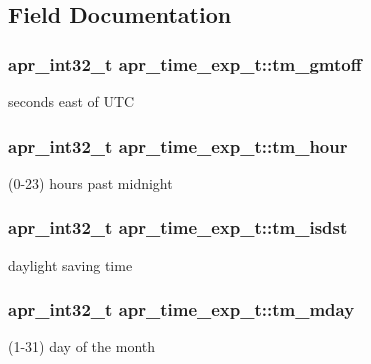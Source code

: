 \subsection{Field Documentation}
\subsubsection[{\texorpdfstring{tm\+\_\+gmtoff}{tm_gmtoff}}]{\setlength{\rightskip}{0pt plus 5cm}apr\+\_\+int32\+\_\+t apr\+\_\+time\+\_\+exp\+\_\+t\+::tm\+\_\+gmtoff}\hypertarget{structapr__time__exp__t_a1102ca16ed70b1c707473431eed58d7b}{}\label{structapr__time__exp__t_a1102ca16ed70b1c707473431eed58d7b}
seconds east of U\+TC 
\subsubsection[{\texorpdfstring{tm\+\_\+hour}{tm_hour}}]{\setlength{\rightskip}{0pt plus 5cm}apr\+\_\+int32\+\_\+t apr\+\_\+time\+\_\+exp\+\_\+t\+::tm\+\_\+hour}\hypertarget{structapr__time__exp__t_a2dbab1d10ed6234c8e9e714e13b7911c}{}\label{structapr__time__exp__t_a2dbab1d10ed6234c8e9e714e13b7911c}
(0-\/23) hours past midnight 
\subsubsection[{\texorpdfstring{tm\+\_\+isdst}{tm_isdst}}]{\setlength{\rightskip}{0pt plus 5cm}apr\+\_\+int32\+\_\+t apr\+\_\+time\+\_\+exp\+\_\+t\+::tm\+\_\+isdst}\hypertarget{structapr__time__exp__t_a4d899f1fb9fde3c6b6893941fa81b1c8}{}\label{structapr__time__exp__t_a4d899f1fb9fde3c6b6893941fa81b1c8}
daylight saving time 
\subsubsection[{\texorpdfstring{tm\+\_\+mday}{tm_mday}}]{\setlength{\rightskip}{0pt plus 5cm}apr\+\_\+int32\+\_\+t apr\+\_\+time\+\_\+exp\+\_\+t\+::tm\+\_\+mday}\hypertarget{structapr__time__exp__t_a6c09a274f011841e9e988c3c9504848a}{}\label{structapr__time__exp__t_a6c09a274f011841e9e988c3c9504848a}
(1-\/31) day of the month 
